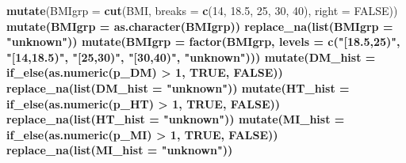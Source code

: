 \documentclass[
]{article}
\newenvironment{Shaded}{\begin{snugshade}}{\end{snugshade}}
\newcommand{\CommentTok}[1]{\textcolor[rgb]{0.56,0.35,0.01}{\textit{#1}}}
\newcommand{\DataTypeTok}[1]{\textcolor[rgb]{0.13,0.29,0.53}{#1}}
\newcommand{\DecValTok}[1]{\textcolor[rgb]{0.00,0.00,0.81}{#1}}
\newcommand{\FloatTok}[1]{\textcolor[rgb]{0.00,0.00,0.81}{#1}}
\newcommand{\KeywordTok}[1]{\textcolor[rgb]{0.13,0.29,0.53}{\textbf{#1}}}
\newcommand{\NormalTok}[1]{#1}
\newcommand{\OperatorTok}[1]{\textcolor[rgb]{0.81,0.36,0.00}{\textbf{#1}}}
\newcommand{\OtherTok}[1]{\textcolor[rgb]{0.56,0.35,0.01}{#1}}
\newcommand{\StringTok}[1]{\textcolor[rgb]{0.31,0.60,0.02}{#1}}
\begin{document}
\begin{Shaded}
\begin{Highlighting}[]
{{{{{{{{\StringTok{  }\KeywordTok{mutate}\NormalTok{(}\DataTypeTok{BMIgrp =} \KeywordTok{cut}\NormalTok{(BMI, }\DataTypeTok{breaks =} \KeywordTok{c}\NormalTok{(}\DecValTok{14}\NormalTok{, }\FloatTok{18.5}\NormalTok{, }\DecValTok{25}\NormalTok{, }\DecValTok{30}\NormalTok{, }\DecValTok{40}\NormalTok{), }\DataTypeTok{right =} \OtherTok{FALSE}\NormalTok{)) }\OperatorTok{%
\StringTok{  }\KeywordTok{mutate}\NormalTok{(}\DataTypeTok{BMIgrp =} \KeywordTok{as.character}\NormalTok{(BMIgrp)) }\OperatorTok{%
\StringTok{  }\KeywordTok{replace_na}\NormalTok{(}\KeywordTok{list}\NormalTok{(}\DataTypeTok{BMIgrp =} \StringTok{"unknown"}\NormalTok{)) }\OperatorTok{%
\StringTok{  }\KeywordTok{mutate}\NormalTok{(}\DataTypeTok{BMIgrp =} \KeywordTok{factor}\NormalTok{(BMIgrp, }\DataTypeTok{levels =} \KeywordTok{c}\NormalTok{(}\StringTok{"[18.5,25)"}\NormalTok{,}
                                            \StringTok{"[14,18.5)"}\NormalTok{,}
                                            \StringTok{"[25,30)"}\NormalTok{, }
                                            \StringTok{"[30,40)"}\NormalTok{, }\StringTok{"unknown"}\NormalTok{))) }\OperatorTok{%
\StringTok{  }\KeywordTok{mutate}\NormalTok{(}\DataTypeTok{DM_hist =} \KeywordTok{if_else}\NormalTok{(}\KeywordTok{as.numeric}\NormalTok{(p_DM) }\OperatorTok{>}\StringTok{ }\DecValTok{1}\NormalTok{, }\OtherTok{TRUE}\NormalTok{, }\OtherTok{FALSE}\NormalTok{)) }\OperatorTok{%
\StringTok{  }\KeywordTok{replace_na}\NormalTok{(}\KeywordTok{list}\NormalTok{(}\DataTypeTok{DM_hist =} \StringTok{"unknown"}\NormalTok{)) }\OperatorTok{%
\StringTok{  }\KeywordTok{mutate}\NormalTok{(}\DataTypeTok{HT_hist =} \KeywordTok{if_else}\NormalTok{(}\KeywordTok{as.numeric}\NormalTok{(p_HT) }\OperatorTok{>}\StringTok{ }\DecValTok{1}\NormalTok{, }\OtherTok{TRUE}\NormalTok{, }\OtherTok{FALSE}\NormalTok{)) }\OperatorTok{%
\StringTok{  }\KeywordTok{replace_na}\NormalTok{(}\KeywordTok{list}\NormalTok{(}\DataTypeTok{HT_hist =} \StringTok{"unknown"}\NormalTok{)) }\OperatorTok{%
\StringTok{  }\KeywordTok{mutate}\NormalTok{(}\DataTypeTok{MI_hist =} \KeywordTok{if_else}\NormalTok{(}\KeywordTok{as.numeric}\NormalTok{(p_MI) }\OperatorTok{>}\StringTok{ }\DecValTok{1}\NormalTok{, }\OtherTok{TRUE}\NormalTok{, }\OtherTok{FALSE}\NormalTok{)) }\OperatorTok{%
\StringTok{  }\KeywordTok{replace_na}\NormalTok{(}\KeywordTok{list}\NormalTok{(}\DataTypeTok{MI_hist =} \StringTok{"unknown"}\NormalTok{)) }\OperatorTok{%
}}}}}}}}}}}}}}}}}}
\end{Highlighting}
\end{Shaded}
\end{document}
